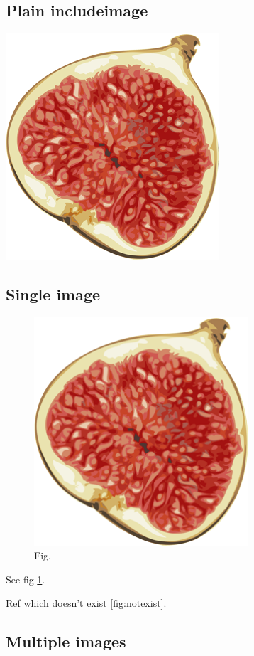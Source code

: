 \documentclass{article}
\begin{document}
  \subsection{Plain includeimage}

  \includegraphics[]{fig.png}

  \subsection{Single image}

  \begin{figure}[h]
    \includegraphics[width=8cm]{fig.png}
    \caption{Fig.}
    \label{fig:fig}
  \end{figure}
  See fig \ref{fig:fig}.

  Ref which doesn't exist \ref{fig:notexist}.

  \subsection{Multiple images}
\end{document}
